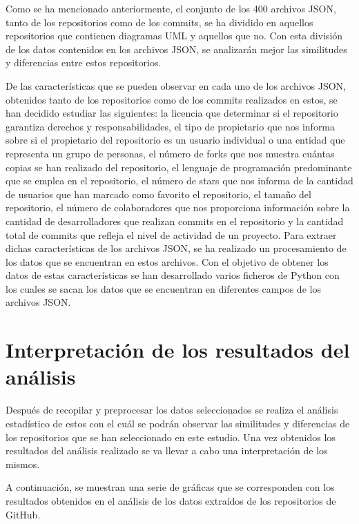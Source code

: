 \documentclass[a4paper, 12pt]{book}
\begin{document}
Como se ha mencionado anteriormente, el conjunto de los 400 archivos JSON, tanto de los repositorios como de los commits, se ha dividido en aquellos repositorios que contienen diagramas UML y aquellos que no. 
Con esta división de los datos contenidos en los archivos JSON, se analizarán mejor las similitudes y diferencias entre estos repositorios. 


De las características que se pueden observar en cada uno de los archivos JSON, obtenidos tanto de los repositorios como de los commits realizados en estos, se han decidido estudiar las siguientes:
la licencia que determinar si el repositorio garantiza derechos y responsabilidades, el tipo de propietario que nos informa sobre si el propietario del repositorio es un usuario individual o una entidad que representa un grupo de personas, 
el número de forks que nos muestra cuántas copias se han realizado del repositorio, el lenguaje de programación predominante que se emplea en el repositorio, el número de stars que nos informa de la cantidad de usuarios que han marcado como favorito el repositorio, 
el tamaño del repositorio, el número de colaboradores que nos proporciona información sobre la cantidad de desarrolladores que realizan commits en el repositorio y la cantidad total de commits que refleja el nivel de actividad de un proyecto.
Para extraer dichas características de los archivos JSON, se ha realizado un procesamiento de los datos que se encuentran en estos archivos.
Con el objetivo de obtener los datos de estas características se han desarrollado varios ficheros de Python con los cuales se sacan los datos que se encuentran en diferentes campos de los archivos JSON.


\section{Interpretación de los resultados del análisis}
\label{sec:interpretación de los resultados del análisis}

Después de recopilar y preprocesar los datos seleccionados se realiza el análisis estadístico de estos con el cuál se podrán observar las similitudes y diferencias de los repositorios que se han seleccionado en este estudio.
Una vez obtenidos los resultados del análisis realizado se va llevar a cabo una interpretación de los mismos.


A continuación, se muestran una serie de gráficas que se corresponden con los resultados obtenidos en el análisis de los datos extraídos de los repositorios de GitHub.
\end{document}
